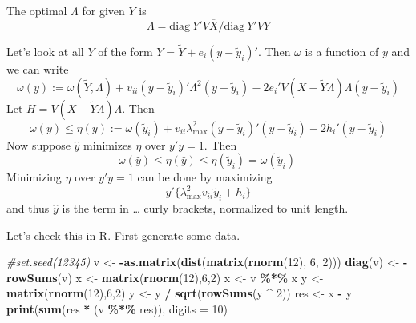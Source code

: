 \documentclass[
  12pt,
]{article}
\newenvironment{Shaded}{\begin{snugshade}}{\end{snugshade}}
\newcommand{\AttributeTok}[1]{\textcolor[rgb]{0.13,0.29,0.53}{#1}}
\newcommand{\CommentTok}[1]{\textcolor[rgb]{0.56,0.35,0.01}{\textit{#1}}}
\newcommand{\DecValTok}[1]{\textcolor[rgb]{0.00,0.00,0.81}{#1}}
\newcommand{\FunctionTok}[1]{\textcolor[rgb]{0.13,0.29,0.53}{\textbf{#1}}}
\newcommand{\NormalTok}[1]{#1}
\newcommand{\OtherTok}[1]{\textcolor[rgb]{0.56,0.35,0.01}{#1}}
\newcommand{\SpecialCharTok}[1]{\textcolor[rgb]{0.81,0.36,0.00}{\textbf{#1}}}
\begin{document}
The optimal \(\Lambda\) for given \(Y\) is
\[
\Lambda = \text{diag}\ Y'V\overline{X} / \text{diag}\ Y'VY
\]

Let's look at all \(Y\) of the form \(Y=\tilde Y+e_i(y-\tilde y_i)'\). Then \(\omega\) is a function
of \(y\) and we can write
\[
\omega(y):=\omega(\tilde Y,\Lambda)+v_{ii}(y-\tilde y_i)'\Lambda^2(y-\tilde y_i)
-2e_i'V(X-\tilde Y\Lambda)\Lambda(y-\tilde y_i)
\]
Let \(H=V(X-\tilde Y\Lambda)\Lambda\). Then
\[
\omega(y)\leq\eta(y):=\omega(\tilde y_i)+v_{ii}\lambda_{\text{max}}^2(y-\tilde y_i)'(y-\tilde y_i)-2h_i'(y-\tilde y_i)
\]
Now suppose \(\hat y\) minimizes \(\eta\) over \(y'y=1\). Then
\[
\omega(\hat y)\leq\eta(\hat y)\leq\eta(\tilde y_i)=\omega(\tilde y_i)\
\]
Minimizing \(\eta\) over \(y'y=1\) can be done by maximizing
\[
y'\{\lambda_{\text{max}}^2v_{ii}\tilde y_i+h_i\}
\]
and thus \(\hat y\) is the term in \ldots{} curly brackets, normalized to unit length.

Let's check this in R. First generate some data.

\begin{Shaded}
\begin{Highlighting}[]
\CommentTok{\#set.seed(12345)}
\NormalTok{v }\OtherTok{\textless{}{-}} \SpecialCharTok{{-}}\FunctionTok{as.matrix}\NormalTok{(}\FunctionTok{dist}\NormalTok{(}\FunctionTok{matrix}\NormalTok{(}\FunctionTok{rnorm}\NormalTok{(}\DecValTok{12}\NormalTok{), }\DecValTok{6}\NormalTok{, }\DecValTok{2}\NormalTok{)))}
\FunctionTok{diag}\NormalTok{(v) }\OtherTok{\textless{}{-}} \SpecialCharTok{{-}}\FunctionTok{rowSums}\NormalTok{(v)}
\NormalTok{x }\OtherTok{\textless{}{-}} \FunctionTok{matrix}\NormalTok{(}\FunctionTok{rnorm}\NormalTok{(}\DecValTok{12}\NormalTok{),}\DecValTok{6}\NormalTok{,}\DecValTok{2}\NormalTok{)}
\NormalTok{x }\OtherTok{\textless{}{-}}\NormalTok{ v }\SpecialCharTok{\%*\%}\NormalTok{ x}
\NormalTok{y }\OtherTok{\textless{}{-}} \FunctionTok{matrix}\NormalTok{(}\FunctionTok{rnorm}\NormalTok{(}\DecValTok{12}\NormalTok{),}\DecValTok{6}\NormalTok{,}\DecValTok{2}\NormalTok{)}
\NormalTok{y }\OtherTok{\textless{}{-}}\NormalTok{ y }\SpecialCharTok{/} \FunctionTok{sqrt}\NormalTok{(}\FunctionTok{rowSums}\NormalTok{(y }\SpecialCharTok{\^{}} \DecValTok{2}\NormalTok{))}
\NormalTok{res }\OtherTok{\textless{}{-}}\NormalTok{ x }\SpecialCharTok{{-}}\NormalTok{ y}
\FunctionTok{print}\NormalTok{(}\FunctionTok{sum}\NormalTok{(res }\SpecialCharTok{*}\NormalTok{ (v }\SpecialCharTok{\%*\%}\NormalTok{ res)), }\AttributeTok{digits =} \DecValTok{10}\NormalTok{)}
\end{Highlighting}
\end{Shaded}
\end{document}
